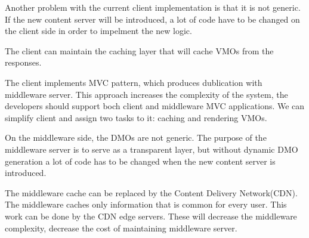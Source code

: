 Another problem with the current client implementation is that it is not generic. If the new content server will be introduced, a lot of code have to be changed on the client side in order to impelment the new logic.

The client can maintain the caching layer that will cache VMOs from the responses. 

The client implements MVC pattern, which produces dublication with middleware server. This approach increases the complexity of the system, the developers should support boch client and middleware MVC applications. We can simplify client and assign two tasks to it: caching and rendering VMOs.

On the middleware side, the DMOs are not generic. The purpose of the middleware server is to serve as a transparent layer, but without dynamic DMO generation a lot of code has to be changed when the new content server is introduced.

The middleware cache can be replaced by the Content Delivery Network(CDN). The middleware caches only information that is common for every user. This work can be done by the CDN edge servers. These will decrease the middleware complexity, decrease the cost of maintaining middleware server.


\newpage
